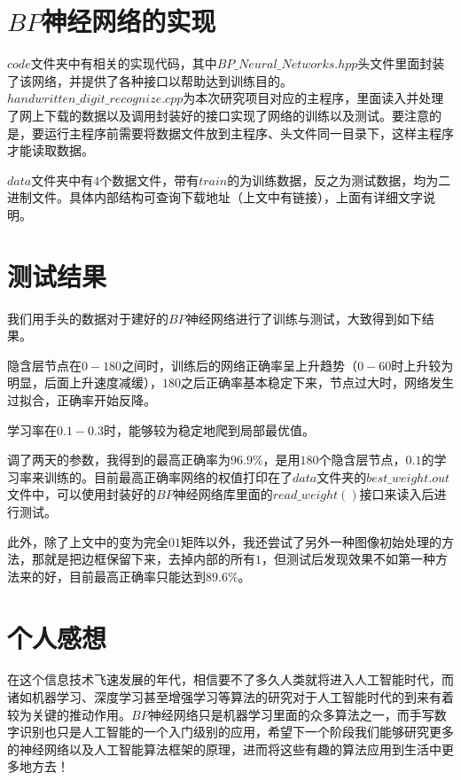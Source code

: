 ﻿\documentclass[UTF8]{ctexart}
\begin{document}
\section{$BP$神经网络的实现}
$code$文件夹中有相关的实现代码，其中$BP\_Neural\_Networks.hpp$头文件里面封装了该网络，并提供了各种接口以帮助达到训练目的。$handwritten\_digit\_recognize.cpp$为本次研究项目对应的主程序，里面读入并处理了网上下载的数据以及调用封装好的接口实现了网络的训练以及测试。要注意的是，要运行主程序前需要将数据文件放到主程序、头文件同一目录下，这样主程序才能读取数据。\par
$data$文件夹中有$4$个数据文件，带有$train$的为训练数据，反之为测试数据，均为二进制文件。具体内部结构可查询下载地址（上文中有链接），上面有详细文字说明。

\section{测试结果}
我们用手头的数据对于建好的$BP$神经网络进行了训练与测试，大致得到如下结果。\par
隐含层节点在$0-180$之间时，训练后的网络正确率呈上升趋势（$0-60$时上升较为明显，后面上升速度减缓），$180$之后正确率基本稳定下来，节点过大时，网络发生过拟合，正确率开始反降。\par
学习率在$0.1-0.3$时，能够较为稳定地爬到局部最优值。\par
调了两天的参数，我得到的最高正确率为$96.9\%$，是用$180$个隐含层节点，$0.1$的学习率来训练的。目前最高正确率网络的权值打印在了$data$文件夹的$best\_weight.out$文件中，可以使用封装好的$BP$神经网络库里面的$read\_weight()$接口来读入后进行测试。\par
此外，除了上文中的变为完全$01$矩阵以外，我还尝试了另外一种图像初始处理的方法，那就是把边框保留下来，去掉内部的所有$1$，但测试后发现效果不如第一种方法来的好，目前最高正确率只能达到$89.6\%$。

\section{个人感想}
在这个信息技术飞速发展的年代，相信要不了多久人类就将进入人工智能时代，而诸如机器学习、深度学习甚至增强学习等算法的研究对于人工智能时代的到来有着较为关键的推动作用。$BP$神经网络只是机器学习里面的众多算法之一，而手写数字识别也只是人工智能的一个入门级别的应用，希望下一个阶段我们能够研究更多的神经网络以及人工智能算法框架的原理，进而将这些有趣的算法应用到生活中更多地方去！
\end{document}
